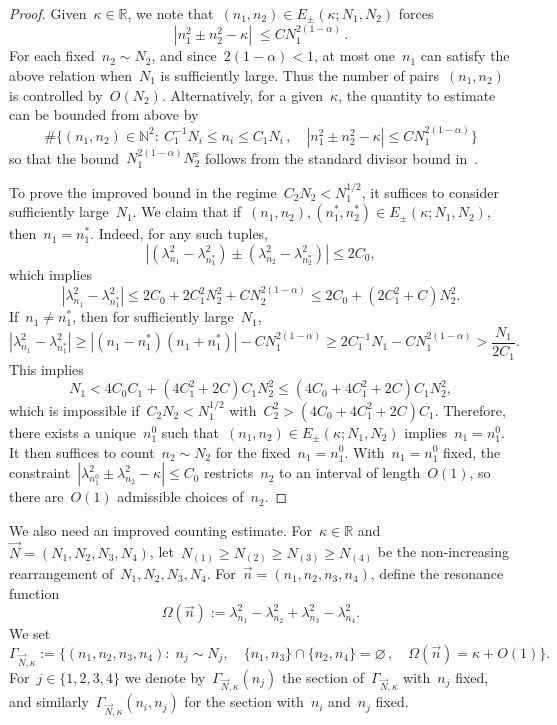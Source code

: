 \documentclass[11pt,reqno,english]{amsart}
\numberwithin{equation}{section}
\theoremstyle{plain}
\theoremstyle{definition}
\theoremstyle{remark}
\newcommand{\R}{\mathbb{R}}
\newcommand{\N}{\mathbb{N}}
\begin{document}
\begin{proof}
	Given~$\kappa\in \R$, we note that~$(n_1,n_2)\in E_{\pm}(\kappa;N_1,N_2)$ forces
	\[
	|n_{1}^{2}\pm n_{2}^{2}-\kappa|\;\leq CN_{1}^{2(1-\alpha)}\,.
	\]
	For each fixed~$n_{2}\sim N_{2}$, and since~$2(1-\alpha)<1$, at most one~$n_{1}$ can satisfy the above relation when~$N_{1}$ is sufficiently large. Thus the number of pairs~$(n_{1},n_{2})$ is controlled by~$O(N_{2})$. Alternatively, for a given~$\kappa$, the quantity to estimate can be bounded from above by
	\[
	\#\big\{
	(n_{1},n_{2})\in \N^{2}:\ C_1^{-1}N_i\leq n_{i}\leq C_1N_{i}\,,\quad |n_{1}^{2}\pm n_{2}^{2} - \kappa|\leq CN_{1}^{2(1-\alpha)}
	\big\}
	\]
	so that the bound~$N_{1}^{2(1-\alpha)}N_{2}^{\varepsilon}$ follows from the standard divisor bound in~\cite[Lemma~3.2]{BGT05}.

	To prove the improved bound in the regime~$C_2N_2 < N_1^{1/2}$, it suffices to consider sufficiently large~$N_1$. We claim that if~$(n_1,n_2),(n_1^*, n_2^*)\in E_{\pm}(\kappa;N_1,N_2)$, then~$n_1=n_1^*$. Indeed, for any such tuples,
	\[
	|(\lambda_{n_1}^2-\lambda_{n_1^*}^2)\pm (\lambda_{n_2}^2-\lambda_{n_2^*}^2)|\leq 2C_0,
	\]
	which implies
	\[
	|\lambda_{n_1}^2-\lambda_{n_1^*}^2|\leq 2C_0+2C_1^2N_2^2+CN_2^{2(1-\alpha)}\leq 2C_0+(2C_1^2+C)N_2^2.
	\]
	If~$n_1\neq n_1^*$, then for sufficiently large~$N_{1}$,
	\[
	|\lambda_{n_1}^2-\lambda_{n_1^*}^2|\geq|(n_1-n_1^*)(n_1+n_1^*)|-CN_1^{2(1-\alpha)}\geq 2C_1^{-1}N_1-CN_1^{2(1-\alpha)}>\frac{N_1}{2C_1}.
	\]
	This implies
	\[
	N_1<4C_0C_1+(4C_1^2+2C)C_1N_2^2\leq (4C_0+4C_1^2+2C)C_1N_2^2,
	\]
	which is impossible if~$C_2N_2<N_1^{1/2}$ with~$C_2^2>(4C_0+4C_1^2+2C)C_1$. Therefore, there exists a unique~$n_1^0$ such that~$(n_1,n_2)\in E_{\pm}(\kappa;N_1,N_2)$ implies~$n_1=n_1^0$. It then suffices to count~$n_2\sim N_2$ for the fixed~$n_1=n_1^0$. With~$n_1=n_1^0$ fixed, the constraint~$|\lambda_{n_1^0}^2\pm\lambda_{n_2}^2-\kappa|\le C_0$ restricts~$n_2$ to an interval of length~$O(1)$, so there are~$O(1)$ admissible choices of~$n_2$.
\end{proof}

We also need an improved counting estimate. For~$\kappa\in \mathbb{R}$ and~$\vec{N}=(N_1,N_2,N_3,N_4)$, let~$N_{(1)}\geq N_{(2)}\geq N_{(3)}\geq N_{(4)}$ be the non-increasing rearrangement of~$N_1,N_2,N_3,N_4$. For~$\vec{n}=(n_1,n_2,n_3,n_4)$, define the resonance function
\begin{equation}\label{def:Omega}
	\Omega(\vec{n}):=\lambda_{n_1}^2-\lambda_{n_2}^2+\lambda_{n_3}^2-\lambda_{n_4}^2.
\end{equation}
We set
\[
\Gamma_{\vec{N},\kappa}:=\{(n_1,n_2,n_3,n_4):\; n_j\sim N_j,\quad \{n_{1},n_{3}\}\cap \{n_{2},n_{4}\}=\varnothing\,,\quad \Omega(\vec{n})=\kappa+O(1)\}.
\]
For~$j\in\{1,2,3,4\}$ we denote by~$\Gamma_{\vec{N},\kappa}(n_j)$ the section of~$\Gamma_{\vec{N},\kappa}$ with~$n_j$ fixed, and similarly~$\Gamma_{\vec{N},\kappa}(n_i,n_j)$ for the section with~$n_i$ and~$n_j$ fixed.
\end{document}
